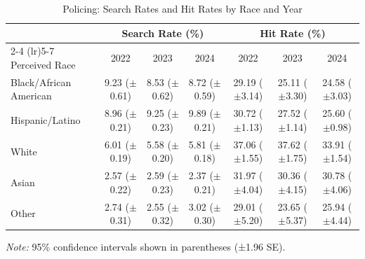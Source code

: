\begin{table}[H]
\centering
\caption{Policing: Search Rates and Hit Rates by Race and Year}
\label{tab:search_hit_rates}
\begin{tabular}{l ccc ccc}
\toprule
 & \multicolumn{3}{c}{Search Rate (\%)} & \multicolumn{3}{c}{Hit Rate (\%)} \\
\cmidrule(lr){2-4} \cmidrule(lr){5-7}
Perceived Race & 2022 & 2023 & 2024 & 2022 & 2023 & 2024 \\
\midrule
Black/African American & 9.23 ({\scriptsize $\pm$0.61}) & 8.53 ({\scriptsize $\pm$0.62}) & 8.72 ({\scriptsize $\pm$0.59}) & 29.19 ({\scriptsize $\pm$3.14}) & 25.11 ({\scriptsize $\pm$3.30}) & 24.58 ({\scriptsize $\pm$3.03}) \\
Hispanic/Latino & 8.96 ({\scriptsize $\pm$0.21}) & 9.25 ({\scriptsize $\pm$0.23}) & 9.89 ({\scriptsize $\pm$0.21}) & 30.72 ({\scriptsize $\pm$1.13}) & 27.52 ({\scriptsize $\pm$1.14}) & 25.60 ({\scriptsize $\pm$0.98}) \\
White & 6.01 ({\scriptsize $\pm$0.19}) & 5.58 ({\scriptsize $\pm$0.20}) & 5.81 ({\scriptsize $\pm$0.18}) & 37.06 ({\scriptsize $\pm$1.55}) & 37.62 ({\scriptsize $\pm$1.75}) & 33.91 ({\scriptsize $\pm$1.54}) \\
Asian & 2.57 ({\scriptsize $\pm$0.22}) & 2.59 ({\scriptsize $\pm$0.23}) & 2.37 ({\scriptsize $\pm$0.21}) & 31.97 ({\scriptsize $\pm$4.04}) & 30.36 ({\scriptsize $\pm$4.15}) & 30.78 ({\scriptsize $\pm$4.06}) \\
Other & 2.74 ({\scriptsize $\pm$0.31}) & 2.55 ({\scriptsize $\pm$0.32}) & 3.02 ({\scriptsize $\pm$0.30}) & 29.01 ({\scriptsize $\pm$5.20}) & 23.65 ({\scriptsize $\pm$5.37}) & 25.94 ({\scriptsize $\pm$4.44}) \\
\bottomrule
\end{tabular}
\smallskip
\parbox{\textwidth}{\footnotesize \textit{Note:} 95\% confidence intervals shown in parentheses (±1.96 SE).}
\end{table}